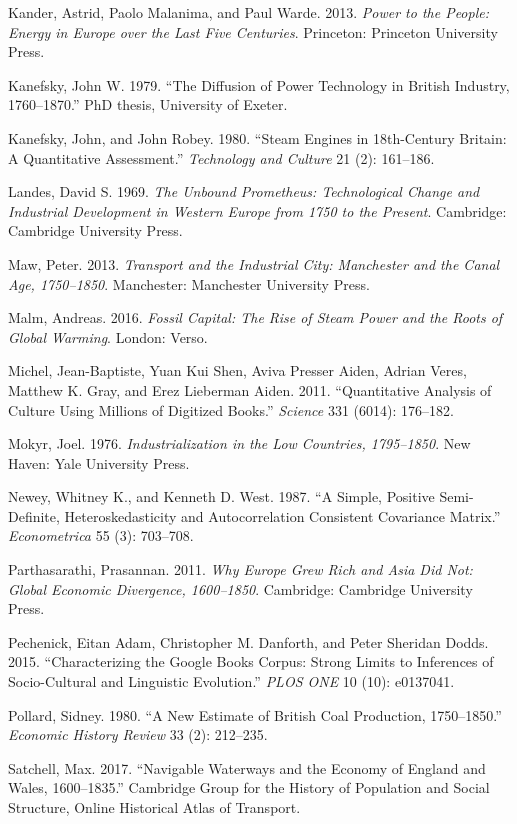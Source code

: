 \documentclass[
  11pt,
]{article}
\begin{document}
Kander, Astrid, Paolo Malanima, and Paul Warde. 2013. \emph{Power to the
People: Energy in Europe over the Last Five Centuries}. Princeton:
Princeton University Press.

Kanefsky, John W. 1979. ``The Diffusion of Power Technology in British
Industry, 1760--1870.'' PhD thesis, University of Exeter.

Kanefsky, John, and John Robey. 1980. ``Steam Engines in 18th-Century
Britain: A Quantitative Assessment.'' \emph{Technology and Culture} 21
(2): 161--186.

Landes, David S. 1969. \emph{The Unbound Prometheus: Technological
Change and Industrial Development in Western Europe from 1750 to the
Present}. Cambridge: Cambridge University Press.

Maw, Peter. 2013. \emph{Transport and the Industrial City: Manchester
and the Canal Age, 1750--1850}. Manchester: Manchester University Press.

Malm, Andreas. 2016. \emph{Fossil Capital: The Rise of Steam Power and
the Roots of Global Warming}. London: Verso.

Michel, Jean-Baptiste, Yuan Kui Shen, Aviva Presser Aiden, Adrian Veres,
Matthew K. Gray, and Erez Lieberman Aiden. 2011. ``Quantitative Analysis
of Culture Using Millions of Digitized Books.'' \emph{Science} 331
(6014): 176--182.

Mokyr, Joel. 1976. \emph{Industrialization in the Low Countries,
1795--1850}. New Haven: Yale University Press.

Newey, Whitney K., and Kenneth D. West. 1987. ``A Simple, Positive
Semi-Definite, Heteroskedasticity and Autocorrelation Consistent
Covariance Matrix.'' \emph{Econometrica} 55 (3): 703--708.

Parthasarathi, Prasannan. 2011. \emph{Why Europe Grew Rich and Asia Did
Not: Global Economic Divergence, 1600--1850}. Cambridge: Cambridge
University Press.

Pechenick, Eitan Adam, Christopher M. Danforth, and Peter Sheridan
Dodds. 2015. ``Characterizing the Google Books Corpus: Strong Limits to
Inferences of Socio-Cultural and Linguistic Evolution.'' \emph{PLOS ONE}
10 (10): e0137041.

Pollard, Sidney. 1980. ``A New Estimate of British Coal Production,
1750--1850.'' \emph{Economic History Review} 33 (2): 212--235.

Satchell, Max. 2017. ``Navigable Waterways and the Economy of England
and Wales, 1600--1835.'' Cambridge Group for the History of Population
and Social Structure, Online Historical Atlas of Transport.
\end{document}
